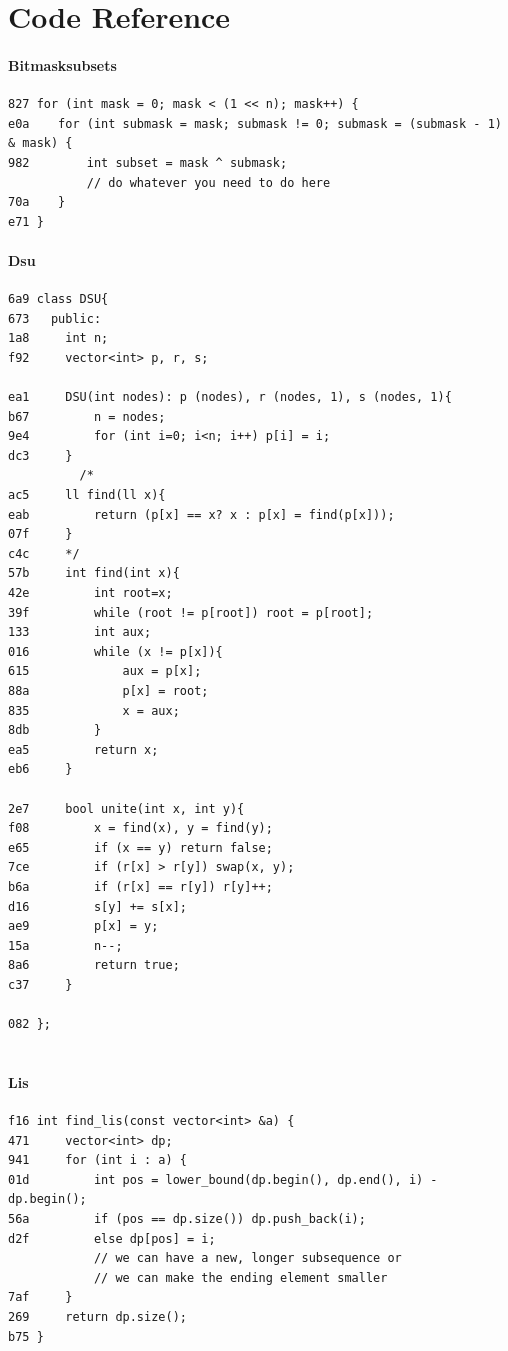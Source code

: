 \documentclass[10pt,a4paper,twocolumn]{article}
\begin{document}
\twocolumn

\tableofcontents
\newpage
\part{Code Reference}
\setcounter{section}{0}
\setcounter{subsection}{0}
\begingroup
\renewcommand{\thesubsection}{\arabic{subsection}}
\subsection{Bitmasksubsets}
\begin{lstlisting}
827 for (int mask = 0; mask < (1 << n); mask++) {
e0a    for (int submask = mask; submask != 0; submask = (submask - 1) & mask) {
982        int subset = mask ^ submask;
           // do whatever you need to do here
70a    }
e71 }
\end{lstlisting}
\subsection{Dsu}
\begin{lstlisting}
6a9 class DSU{
673   public:
1a8     int n;
f92     vector<int> p, r, s;
     
ea1     DSU(int nodes): p (nodes), r (nodes, 1), s (nodes, 1){
b67         n = nodes;
9e4         for (int i=0; i<n; i++) p[i] = i;
dc3     }
    	  /*
ac5     ll find(ll x){
eab         return (p[x] == x? x : p[x] = find(p[x]));
07f     }
c4c     */
57b     int find(int x){
42e         int root=x;
39f         while (root != p[root]) root = p[root];
133         int aux;
016         while (x != p[x]){
615             aux = p[x];
88a             p[x] = root;
835             x = aux;
8db         }
ea5         return x;
eb6     }
     
2e7     bool unite(int x, int y){
f08         x = find(x), y = find(y);
e65         if (x == y) return false;
7ce         if (r[x] > r[y]) swap(x, y);
b6a         if (r[x] == r[y]) r[y]++;
d16         s[y] += s[x];
ae9         p[x] = y;
15a         n--;
8a6         return true;
c37     }
     
082 };


\end{lstlisting}
\subsection{Lis}
\begin{lstlisting}
f16 int find_lis(const vector<int> &a) {
471 	vector<int> dp;
941 	for (int i : a) {
01d 		int pos = lower_bound(dp.begin(), dp.end(), i) - dp.begin();
56a 		if (pos == dp.size()) dp.push_back(i);
d2f 		else dp[pos] = i;
    		// we can have a new, longer subsequence or
    		// we can make the ending element smaller
7af 	}
269 	return dp.size();
b75 }
\end{lstlisting}
\end{document}
